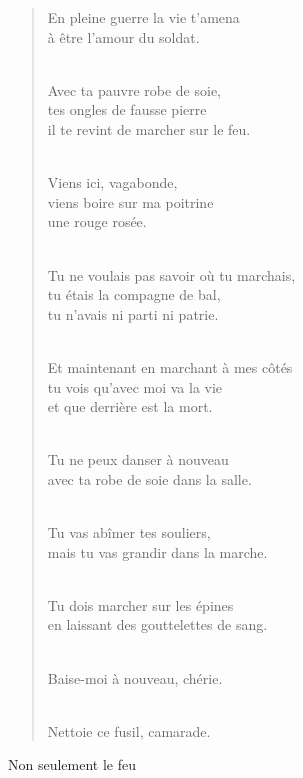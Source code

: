 \documentclass[11pt,a4paper]{book}
\begin{document}
\begin{verse}
En pleine guerre la vie t'amena \\
à être l'amour du soldat. \\ \

Avec ta pauvre robe de soie, \\
tes ongles de fausse pierre \\
il te revint de marcher sur le feu. \\ \

Viens ici, vagabonde, \\
viens boire sur ma poitrine \\
une rouge rosée. \\ \

Tu ne voulais pas savoir où tu marchais, \\
tu étais la compagne de bal, \\
tu n'avais ni parti ni patrie. \\ \

Et maintenant en marchant à mes côtés \\
tu vois qu'avec moi va la vie \\
et que derrière est la mort. \\ \

Tu ne peux danser à nouveau \\
avec ta robe de soie dans la salle. \\ \

Tu vas abîmer tes souliers, \\
mais tu vas grandir dans la marche. \\ \

Tu dois marcher sur les épines \\
en laissant des gouttelettes de sang. \\ \

Baise-moi à nouveau, chérie. \\ \

Nettoie ce fusil, camarade.
\end{verse}


\newpage

{\huge Non seulement le feu} \\ \\
\end{document}
